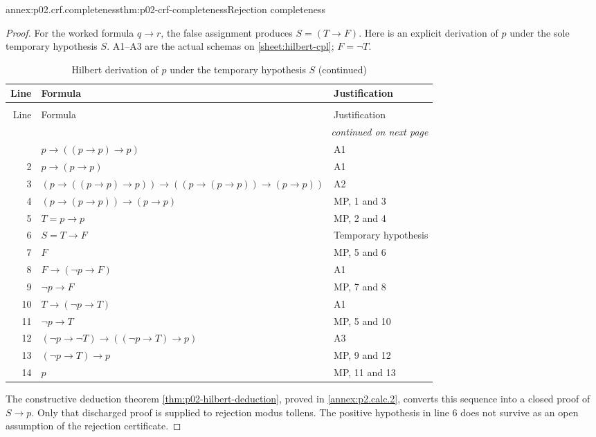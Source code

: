 \begin{annexitem}{annex:p02.crf.completeness}{thm:p02-crf-completeness}{Rejection completeness}
\begin{proof}
For the worked formula \(q\to r\), the false assignment produces
\(S=(T\to F)\). Here is an explicit derivation of \(p\) under
the sole temporary hypothesis \(S\). A1--A3 are the actual schemas
on \cref{sheet:hilbert-cpl}; \(F=\neg T\).
\begin{longtable}{@{}r p{} p{}@{}}
\caption{Hilbert derivation of \(p\) under the temporary hypothesis \(S\)}\\
\toprule Line & Formula & Justification\\\midrule
\endfirsthead
\caption[]{Hilbert derivation of \(p\) under the temporary hypothesis \(S\) (continued)}\\
\toprule Line & Formula & Justification\\\midrule
\endhead
\midrule\multicolumn{3}{r}{\emph{continued on next page}}\\
\endfoot
\endlastfoot
1 & \(p\to((p\to p)\to p)\) & A1\\
2 & \(p\to(p\to p)\) & A1\\
3 & \((p\to((p\to p)\to p))\to((p\to(p\to p))\to(p\to p))\) & A2\\
4 & \((p\to(p\to p))\to(p\to p)\) & MP, 1 and 3\\
5 & \(T=p\to p\) & MP, 2 and 4\\
6 & \(S=T\to F\) & Temporary hypothesis\\
7 & \(F\) & MP, 5 and 6\\
8 & \(F\to(\neg p\to F)\) & A1\\
9 & \(\neg p\to F\) & MP, 7 and 8\\
10 & \(T\to(\neg p\to T)\) & A1\\
11 & \(\neg p\to T\) & MP, 5 and 10\\
12 & \((\neg p\to\neg T)\to((\neg p\to T)\to p)\) & A3\\
13 & \((\neg p\to T)\to p\) & MP, 9 and 12\\
14 & \(p\) & MP, 11 and 13\\
\bottomrule
\end{longtable}
The constructive deduction theorem
\cref{thm:p02-hilbert-deduction}, proved in
\cref{annex:p2.calc.2}, converts this sequence into a closed
proof of \(S\to p\). Only that discharged proof is supplied to
rejection modus tollens. The positive hypothesis in line 6 does not
survive as an open assumption of the rejection certificate.
\end{proof}
\end{annexitem}

